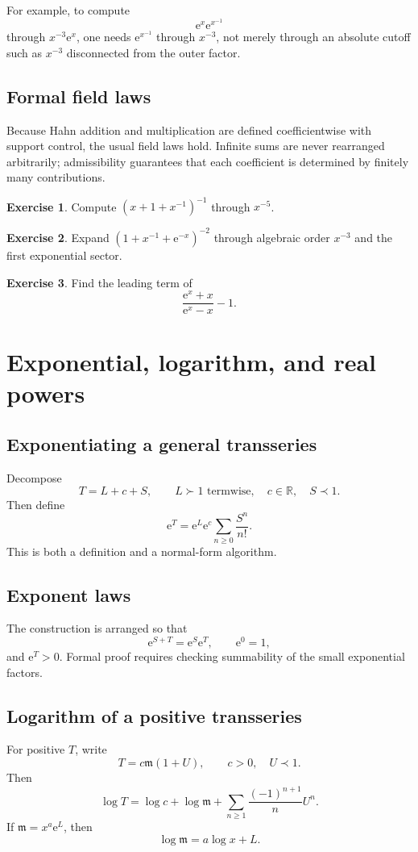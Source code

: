 \documentclass[11pt,oneside,openany]{book}
\newcommand{\R}{\mathbb{R}}
\newcommand{\e}{\mathrm{e}}
\newcommand{\mon}{\mathfrak{m}}
\theoremstyle{plain}
\theoremstyle{definition}
\newtheorem{exercise}{Exercise}[chapter]
\theoremstyle{remark}
\begin{document}
For example, to compute
\[
  \e^x\e^{x^{-1}}
\]
through $x^{-3}\e^x$, one needs $\e^{x^{-1}}$ through $x^{-3}$, not merely through an absolute cutoff such as $x^{-3}$ disconnected from the outer factor.

\section{Formal field laws}
Because Hahn addition and multiplication are defined coefficientwise with support control, the usual field laws hold. Infinite sums are never rearranged arbitrarily; admissibility guarantees that each coefficient is determined by finitely many contributions.

\begin{exercise}
Compute $(x+1+x^{-1})^{-1}$ through $x^{-5}$.
\end{exercise}

\begin{exercise}
Expand $(1+x^{-1}+\e^{-x})^{-2}$ through algebraic order $x^{-3}$ and the first exponential sector.
\end{exercise}

\begin{exercise}
Find the leading term of
\[
  \frac{\e^x+x}{\e^x-x} -1.
\]
\end{exercise}


\chapter{Exponential, logarithm, and real powers}
\label{ch:exp-log}

\section{Exponentiating a general transseries}
Decompose
\[
  T=L+c+S,
  \qquad L\succ1\text{ termwise},
  \quad c\in\R,
  \quad S\prec1.
\]
Then define
\[
  \e^T=\e^L\e^c\sum_{n\ge0}\frac{S^n}{n!}.
\]
This is both a definition and a normal-form algorithm.

\section{Exponent laws}
The construction is arranged so that
\[
  \e^{S+T}=\e^S\e^T,
  \qquad \e^0=1,
\]
and $\e^T>0$. Formal proof requires checking summability of the small exponential factors.

\section{Logarithm of a positive transseries}
For positive $T$, write
\[
  T=c\mon(1+U),
  \qquad c>0,
  \quad U\prec1.
\]
Then
\[
  \log T=\log c+\log\mon+
  \sum_{n\ge1}\frac{(-1)^{n+1}}nU^n.
\]
If $\mon=x^a\e^L$, then
\[
  \log\mon=a\log x+L.
\]
\end{document}
